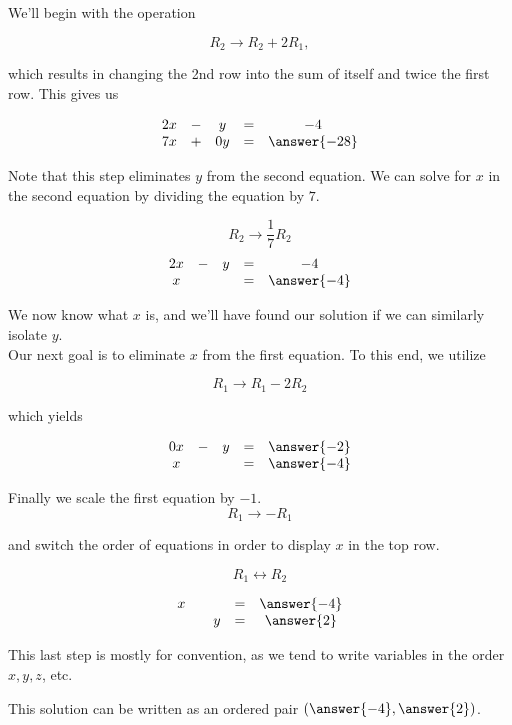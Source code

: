 \documentclass{ximera}
\begin{document}
\begin{example}
    We'll begin with the operation
    
    $$R_2\rightarrow R_2+2R_1,$$
    
    which results in changing the 2nd row into the sum of itself and twice the first row.  This gives us
     
    $$ \begin{matrix}
          2x& -&y&=&-4\\
          7x & +&0y&= &\answer{-28} 
        \end{matrix}$$
     
    Note that this step eliminates $y$ from the second equation. We can solve for $x$ in the second equation by dividing the equation by $7$. 
    
    $$R_2\rightarrow \frac{1}{7}R_2$$
    $$\begin{matrix}
           2x& -&y&=&-4\\
          x & &&= &\answer{-4}
           \end{matrix}$$
       
    We now know what $x$ is, and we'll have found our solution if we can similarly isolate $y$. \\
    
    Our next goal is to eliminate $x$ from the first equation.  To this end, we utilize
    
    $$R_1\rightarrow R_1-2R_2$$

    which yields
     
    $$\begin{matrix}
         0x& -&y&=&\answer{-2}\\
         x & &&= &\answer{-4} \\
        \end{matrix}$$
     
    Finally we scale the first equation by $-1$. $$R_1\rightarrow -R_1$$
         
    and switch the order of equations in order to display $x$ in the top row. 
    
    $$R_1\leftrightarrow R_2$$ 
     
    $$\begin{matrix}
          x & &&= &\answer{-4}\\
          & &y&=&\answer{2}     
        \end{matrix}$$
    
    This last step is mostly for convention, as we tend to write variables in the order $x, y, z$, etc.
       
    This solution can be written as an ordered pair $(\answer{-4}, \answer{2})$.

\end{example}
    
\end{document}
